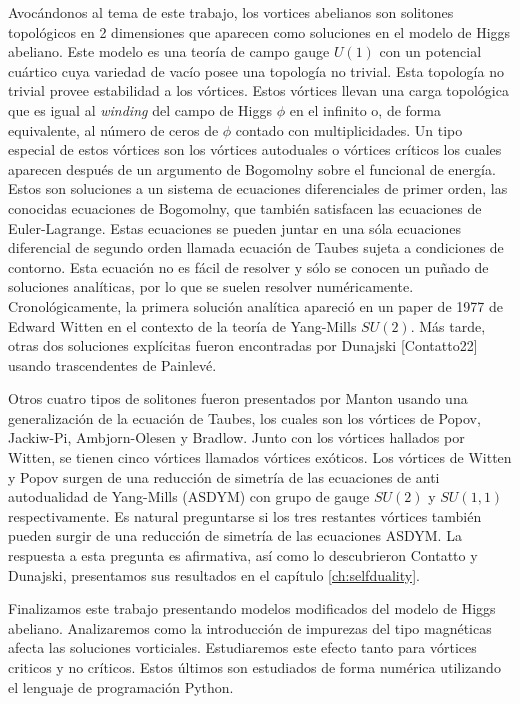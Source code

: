 Avocándonos al tema de este trabajo, los vortices abelianos son solitones topológicos en 2 dimensiones que aparecen como soluciones en el modelo de Higgs abeliano. Este modelo es una teoría de campo gauge $U(1)$ con un potencial cuártico cuya variedad de vacío posee una topología no trivial. Esta topología no trivial provee estabilidad a los vórtices. Estos vórtices llevan una carga topológica que es igual al \emph{winding} del campo de Higgs $\phi$ en el infinito o, de forma equivalente, al número de ceros de $\phi$ contado con multiplicidades. Un tipo especial de estos vórtices son los vórtices autoduales o vórtices críticos los cuales aparecen después de un argumento de Bogomolny sobre el funcional de energía. Estos son soluciones a un sistema de ecuaciones diferenciales de primer orden, las conocidas ecuaciones de Bogomolny, que también satisfacen las ecuaciones de Euler-Lagrange. Estas ecuaciones se pueden juntar en una sóla ecuaciones diferencial de segundo orden llamada ecuación de Taubes sujeta a condiciones de contorno. Esta ecuación no es fácil de resolver y sólo se conocen un puñado de soluciones analíticas, por lo que se suelen resolver numéricamente. Cronológicamente, la primera solución analítica apareció en un paper de 1977 de Edward Witten en el contexto de la teoría de Yang-Mills $SU(2)$. Más tarde, otras dos soluciones explícitas fueron encontradas por Dunajski [Contatto22] usando trascendentes de Painlevé.

Otros cuatro tipos de solitones fueron presentados por Manton usando una generalización de la ecuación de Taubes, los cuales son los vórtices de Popov, Jackiw-Pi, Ambjorn-Olesen y Bradlow. Junto con los vórtices hallados por Witten, se tienen cinco vórtices llamados vórtices exóticos. Los vórtices de Witten y Popov surgen de una reducción de simetría de las ecuaciones de anti autodualidad de Yang-Mills (ASDYM) con grupo de gauge $SU(2)$ y $SU(1,1)$ respectivamente. Es natural preguntarse si los tres restantes vórtices también pueden surgir de una reducción de simetría de las ecuaciones ASDYM. La respuesta a esta pregunta es afirmativa, así como lo descubrieron Contatto y Dunajski, presentamos sus resultados en el capítulo \ref{ch:selfduality}.

Finalizamos este trabajo presentando modelos modificados del modelo de Higgs abeliano. Analizaremos como la introducción de impurezas del tipo magnéticas afecta las soluciones vorticiales. Estudiaremos este efecto tanto para vórtices criticos y no críticos. Estos últimos son estudiados de forma numérica utilizando el lenguaje de programación Python.

